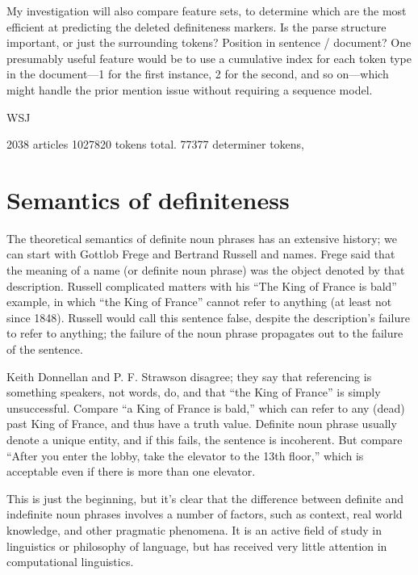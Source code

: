 \documentclass[11pt]{article}
\begin{document}
My investigation will also compare feature sets, to determine which are the most efficient at predicting the deleted definiteness markers. Is the parse structure important, or just the surrounding tokens? Position in sentence / document? One presumably useful feature would be to use a cumulative index for each token type in the document---1 for the first instance, 2 for the second, and so on---which might handle the prior mention issue without requiring a sequence model.

WSJ

2038 articles
1027820 tokens total.
77377 determiner tokens,


\section{}




\section{Semantics of definiteness}
The theoretical semantics of definite noun phrases has an extensive history; we can start with Gottlob Frege and Bertrand Russell and names. Frege said that the meaning of a name (or definite noun phrase) was the object denoted by that description. Russell complicated matters with his ``The King of France is bald'' example, in which ``the King of France'' cannot refer to anything (at least not since 1848). Russell would call this sentence false, despite the description's failure to refer to anything; the failure of the noun phrase propagates out to the failure of the sentence.

Keith Donnellan and P. F. Strawson disagree; they say that referencing is something speakers, not words, do, and that ``the King of France'' is simply unsuccessful.
Compare ``a King of France is bald,'' which can refer to any (dead) past King of France, and thus have a truth value. Definite noun phrase usually denote a unique entity, and if this fails, the sentence is incoherent. But compare ``After you enter the lobby, take the elevator to the 13th floor,'' which is acceptable even if there is more than one elevator.

This is just the beginning, but it's clear that the difference between definite and indefinite noun phrases involves a number of factors, such as context, real world knowledge, and other pragmatic phenomena. It is an active field of study in linguistics or philosophy of language, but has received very little attention in computational linguistics.
\end{document}
